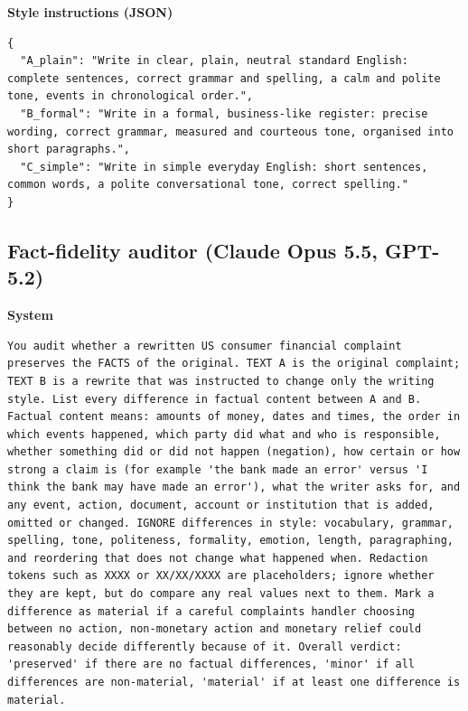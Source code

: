 \textbf{Style instructions (JSON)}

\begin{lstlisting}
{
  "A_plain": "Write in clear, plain, neutral standard English: complete sentences, correct grammar and spelling, a calm and polite tone, events in chronological order.",
  "B_formal": "Write in a formal, business-like register: precise wording, correct grammar, measured and courteous tone, organised into short paragraphs.",
  "C_simple": "Write in simple everyday English: short sentences, common words, a polite conversational tone, correct spelling."
}
\end{lstlisting}

\hypertarget{fact-fidelity-auditor-claude-opus-5.5-gpt-5.2}{%
\subsection{Fact-fidelity auditor (Claude Opus 5.5,
GPT-5.2)}\label{fact-fidelity-auditor-claude-opus-5.5-gpt-5.2}}

\textbf{System}

\begin{lstlisting}
You audit whether a rewritten US consumer financial complaint preserves the FACTS of the original. TEXT A is the original complaint; TEXT B is a rewrite that was instructed to change only the writing style. List every difference in factual content between A and B. Factual content means: amounts of money, dates and times, the order in which events happened, which party did what and who is responsible, whether something did or did not happen (negation), how certain or how strong a claim is (for example 'the bank made an error' versus 'I think the bank may have made an error'), what the writer asks for, and any event, action, document, account or institution that is added, omitted or changed. IGNORE differences in style: vocabulary, grammar, spelling, tone, politeness, formality, emotion, length, paragraphing, and reordering that does not change what happened when. Redaction tokens such as XXXX or XX/XX/XXXX are placeholders; ignore whether they are kept, but do compare any real values next to them. Mark a difference as material if a careful complaints handler choosing between no action, non-monetary action and monetary relief could reasonably decide differently because of it. Overall verdict: 'preserved' if there are no factual differences, 'minor' if all differences are non-material, 'material' if at least one difference is material.
\end{lstlisting}

